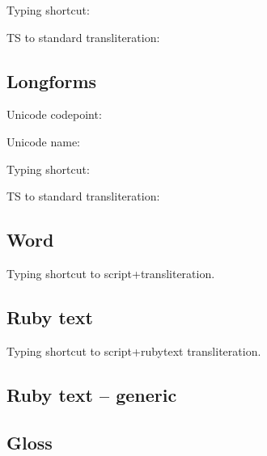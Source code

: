 \noindent Typing shortcut: 

\noindent TS to standard transliteration: 

\subsection{Longforms}
\cdrdhead{\ugtransXX}

\noindent Unicode codepoint: 

\noindent Unicode name: 

\noindent Typing shortcut: 

\noindent TS to standard transliteration: 

\subsection{Word}
Typing shortcut to script+transliteration.

\cdrdhead{\ugw}

\noindent {}

\cdrdhead{\ugtext[w]}

\noindent {}

\subsection{Ruby text}
Typing shortcut to script+rubytext transliteration.

\cdrdhead{\ugruby}

\noindent {}

\cdrdhead{\ugtext[ruby]}

\noindent {}

\noindent {}

\subsection{Ruby text -- generic}
\cdrdhead{\truby{}{}{}}

\noindent{}

\noindent{}

\noindent{}



\subsection{Gloss}
\cdrdhead{\uggloss}

